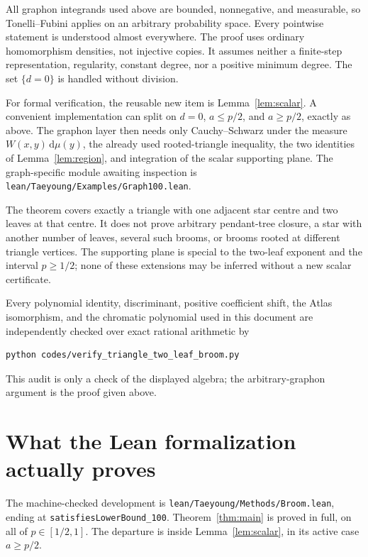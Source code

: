 \documentclass[11pt]{article}
\newcommand{\dd}{\,\mathrm d}
\begin{document}
All graphon integrands used above are bounded, nonnegative, and measurable,
so Tonelli--Fubini applies on an arbitrary probability space.  Every
pointwise statement is understood almost everywhere.  The proof uses
ordinary homomorphism densities, not injective copies.  It assumes neither
a finite-step representation, regularity, constant degree, nor a positive
minimum degree.  The set $\{d=0\}$ is handled without division.

For formal verification, the reusable new item is
Lemma~\ref{lem:scalar}.  A convenient implementation can split on
$d=0$, $a\leq p/2$, and $a\geq p/2$, exactly as above.  The graphon layer
then needs only Cauchy--Schwarz under the measure $W(x,y)\dd\mu(y)$, the
already used rooted-triangle inequality, the two identities of
Lemma~\ref{lem:region}, and integration of the scalar supporting plane.
The graph-specific module awaiting inspection is
\texttt{lean/Taeyoung/Examples/Graph100.lean}.

The theorem covers exactly a triangle with one adjacent star centre and two
leaves at that centre.  It does not prove arbitrary pendant-tree closure,
a star with another number of leaves, several such brooms, or brooms rooted
at different triangle vertices.  The supporting plane is special to the
two-leaf exponent and the interval $p\geq1/2$; none of these extensions may
be inferred without a new scalar certificate.

Every polynomial identity, discriminant, positive coefficient shift, the
Atlas isomorphism, and the chromatic polynomial used in this document are
independently checked over exact rational arithmetic by
\begin{verbatim}
python codes/verify_triangle_two_leaf_broom.py
\end{verbatim}
This audit is only a check of the displayed algebra; the arbitrary-graphon
argument is the proof given above.

\section{What the Lean formalization actually proves}

The machine-checked development is
\texttt{lean/Taeyoung/Methods/Broom.lean}, ending at
\texttt{satisfiesLowerBound\_100}.  Theorem~\ref{thm:main} is proved in full, on
all of $p\in[1/2,1]$.  The departure is inside Lemma~\ref{lem:scalar}, in its
active case $a\geq p/2$.
\end{document}
